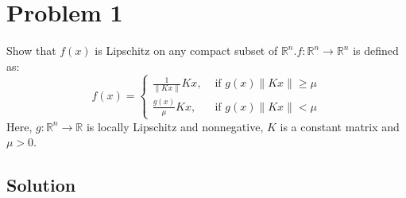 \section*{Problem 1}

Show that \( f(x) \) is Lipschitz on any compact subset of \( \mathbb{R}^{n} . f: \mathbb{R}^{n} \rightarrow \mathbb{R}^{n} \) is defined as:
\begin{equation*}
    f(x)= \begin{cases}\frac{1}{\|K x\|} K x, & \text { if } g(x)\|K x\| \geq \mu \\ \frac{g(x)}{\mu} K x, & \text { if } g(x)\|K x\|<\mu\end{cases}
\end{equation*}
Here, \( g: \mathbb{R}^{n} \rightarrow \mathbb{R} \) is locally Lipschitz and nonnegative, \( K \) is a constant matrix and \( \mu>0 \).

\subsection*{Solution}
